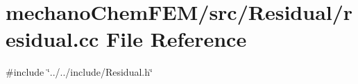 \section{mechano\+Chem\+F\+E\+M/src/\+Residual/residual.cc File Reference}
\label{residual_8cc}
{\ttfamily \#include \char`\"{}../../include/\+Residual.\+h\char`\"{}}\newline
